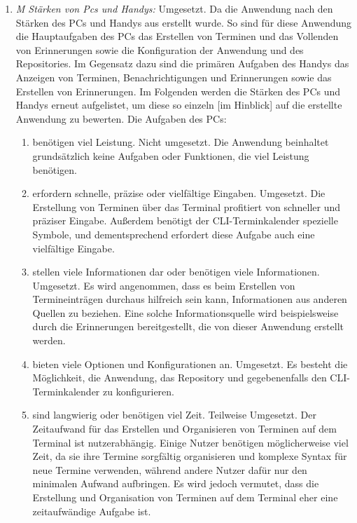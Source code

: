 \begin{enumerate}
	\item \textit{M Stärken von Pcs und Handys:}\newline%
		Umgesetzt. Da die Anwendung nach den Stärken des PCs und Handys aus  erstellt wurde. %
			So sind für diese Anwendung die Hauptaufgaben des PCs das Erstellen von Terminen und das Vollenden von Erinnerungen sowie die Konfiguration der Anwendung und des Repositories. Im Gegensatz dazu sind die primären Aufgaben des Handys das Anzeigen von Terminen, Benachrichtigungen und Erinnerungen sowie das Erstellen von Erinnerungen.\newline%
			Im Folgenden werden die Stärken des PCs und Handys erneut aufgelistet, um diese so einzeln [im Hinblick] auf die erstellte Anwendung zu bewerten.\newline%
		\myNewSection
		Die Aufgaben des PCs:%
  		\begin{enumerate}[label*={\arabic*}]
			\item benötigen viel Leistung.\newline%
				Nicht umgesetzt. Die Anwendung beinhaltet grundsätzlich keine Aufgaben oder Funktionen, die viel Leistung benötigen.%
			\item erfordern schnelle, präzise oder vielfältige Eingaben.\newline%
				Umgesetzt. Die Erstellung von Terminen über das Terminal profitiert von schneller und präziser Eingabe. Außerdem benötigt der CLI-Terminkalender spezielle Symbole, und dementsprechend erfordert diese Aufgabe auch eine vielfältige Eingabe.%
			\item stellen viele Informationen dar oder benötigen viele Informationen.\newline%
				Umgesetzt. Es wird angenommen, dass es beim Erstellen von Termineinträgen durchaus hilfreich sein kann, Informationen aus anderen Quellen zu beziehen. Eine solche Informationsquelle wird beispielsweise durch die Erinnerungen bereitgestellt, die von dieser Anwendung erstellt werden.
			\item bieten viele Optionen und Konfigurationen an.\newline%
				Umgesetzt. Es besteht die Möglichkeit, die Anwendung, das Repository und gegebenenfalls den CLI-Terminkalender zu konfigurieren.%
			\item sind langwierig oder benötigen viel Zeit.\newline%
				Teilweise Umgesetzt. Der Zeitaufwand für das Erstellen und Organisieren von Terminen auf dem Terminal ist nutzerabhängig. Einige Nutzer benötigen möglicherweise viel Zeit, da sie ihre Termine sorgfältig organisieren und komplexe Syntax für neue Termine verwenden, während andere Nutzer dafür nur den minimalen Aufwand aufbringen. Es wird jedoch vermutet, dass die Erstellung und Organisation von Terminen auf dem Terminal eher eine zeitaufwändige Aufgabe ist.%

\end{enumerate}
\end{enumerate}
